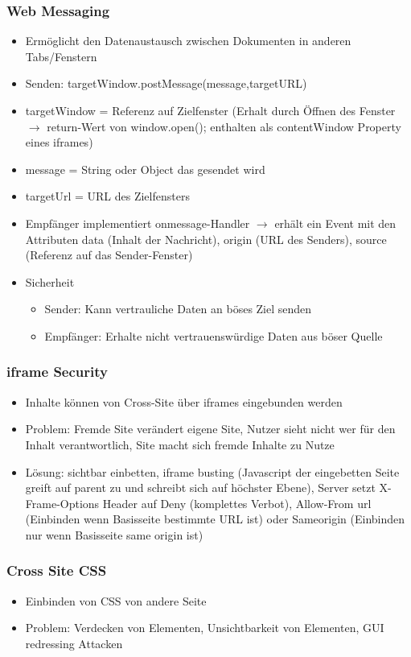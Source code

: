 \documentclass{article} %
\begin{document}
	\subsubsection{Web Messaging}
	\begin{itemize}
		\item Ermöglicht den Datenaustausch zwischen Dokumenten in anderen Tabs/Fenstern
		\item Senden: targetWindow.postMessage(message,targetURL)
		\item targetWindow = Referenz auf Zielfenster (Erhalt durch Öffnen des Fenster $\rightarrow$ return-Wert von window.open(); enthalten als contentWindow Property eines iframes)
		\item message = String oder Object das gesendet wird
		\item targetUrl = URL des Zielfensters
		\item Empfänger implementiert onmessage-Handler $\rightarrow$ erhält ein Event mit den Attributen data (Inhalt der Nachricht), origin (URL des Senders), source (Referenz auf das Sender-Fenster)
		\item Sicherheit
		\begin{itemize}
			\item Sender: Kann vertrauliche Daten an böses Ziel senden 
			\item Empfänger: Erhalte nicht vertrauenswürdige Daten aus böser Quelle
		\end{itemize}
	\end{itemize}
	\subsubsection{iframe Security}
	\begin{itemize}
		\item Inhalte können von Cross-Site über iframes eingebunden werden
		\item Problem: Fremde Site verändert eigene Site, Nutzer sieht nicht wer für den Inhalt verantwortlich, Site macht sich fremde Inhalte zu Nutze
		\item Lösung: sichtbar einbetten, iframe busting (Javascript der eingebetten Seite greift auf parent zu und schreibt sich auf höchster Ebene), Server setzt X-Frame-Options Header auf Deny (komplettes Verbot), Allow-From url (Einbinden wenn Basisseite bestimmte URL ist) oder Sameorigin (Einbinden nur wenn Basisseite same origin ist)
	\end{itemize}
	\subsubsection{Cross Site CSS}
	\begin{itemize}
		\item Einbinden von CSS von andere Seite
		\item Problem: Verdecken von Elementen, Unsichtbarkeit von Elementen, GUI redressing Attacken
	\end{itemize}
\end{document}
